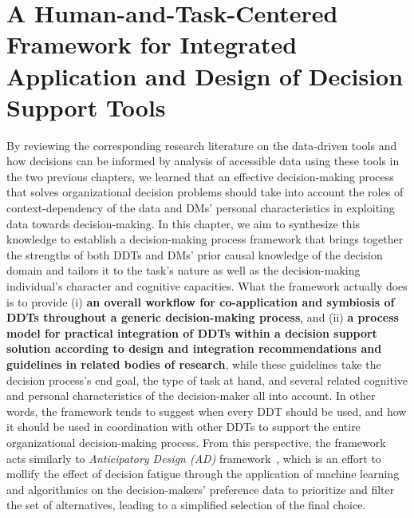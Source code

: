 \documentclass{sfuthesis}
\begin{document}
\chapter{A Human-and-Task-Centered Framework for Integrated Application and Design of Decision Support Tools}
By reviewing the corresponding research literature on the data-driven tools and how decisions can be informed by analysis of accessible data using these tools in the two previous chapters, we learned that an effective decision-making process that solves organizational decision problems should take into account the roles of context-dependency of the data and DMs’ personal characteristics in exploiting data towards decision-making. In this chapter, we aim to synthesize this knowledge to establish a decision-making process framework that brings together the strengths of both DDTs and DMs’ prior causal knowledge of the decision domain and tailors it to the task’s nature as well as the decision-making individual’s character and cognitive capacities. What the framework actually does is to provide (i) \textbf{an overall workflow for co-application and symbiosis of DDTs throughout a generic decision-making process}, and (ii) \textbf{a process model for practical integration of DDTs within a decision support solution according to design and integration recommendations and guidelines in related bodies of research}, while these guidelines take the decision process’s end goal, the type of task at hand, and several related cognitive and personal characteristics of the decision-maker all into account. In other words, the framework tends to suggest when every DDT should be used, and how it should be used in coordination with other DDTs to support the entire organizational decision-making process. From this perspective, the framework acts similarly to \textit{Anticipatory Design (AD)} framework~\cite{cerejo2020lens, cerejo2023anticipation}, which is an effort to mollify the effect of decision fatigue through the application of machine learning and algorithmics on the decision-makers’ preference data to prioritize and filter the set of alternatives, leading to a simplified selection of the final choice.
\end{document}

